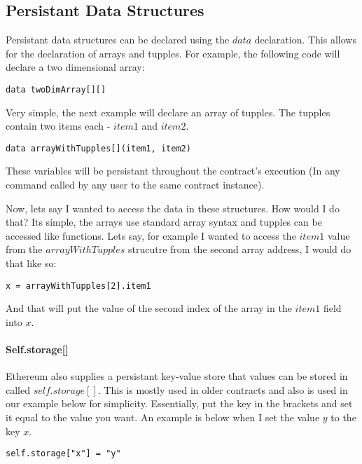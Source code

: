 \documentclass[12pt]{article}
\begin{document}
\subsection{Persistant Data Structures}

Persistant data structures can be declared using the $data$ declaration. This allows for the declaration of arrays and tupples. For example, the following code will declare a two dimensional array:

\begin{lstlisting}
data twoDimArray[][]
\end{lstlisting}

Very simple, the next example will declare an array of tupples. The tupples contain two items each - $item1$ and $item2$.

\begin{lstlisting}
data arrayWithTupples[](item1, item2)
\end{lstlisting}

These variables will be persistant throughout the contract's execution (In any command called by any user to the same contract instance).

Now, lets say I wanted to access the data in these structures. How would I do that? Its simple, the arrays use standard array syntax and tupples can be accessed like functions. Lets say, for example I wanted to access the $item1$ value from the $arrayWithTupples$ strucutre from the second array address, I would do that like so:

\begin{lstlisting}
x = arrayWithTupples[2].item1
\end{lstlisting}

And that will put the value of the second index of the array in the $item1$ field into $x$. \cite{Serpent}

\paragraph{Self.storage[]}
Ethereum also supplies a persistant key-value store that values can be stored in called $self.storage[]$. This is mostly used in older contracts and also is used in our example below for simplicity. Essentially, put the key in the brackets and set it equal to the value you want. An example is below when I set the value $y$ to the key $x$.

\begin{lstlisting}
self.storage["x"] = "y"
\end{lstlisting}
\end{document}
